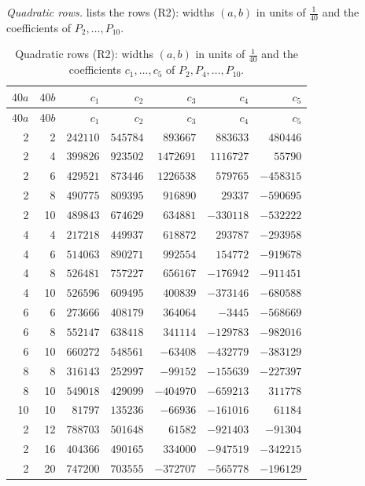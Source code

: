\documentclass[11pt,colorlinks]{charlie}
\begin{document}
\emph{Quadratic rows.}  lists the rows (R2): widths $(a,b)$ in units of $\frac1{40}$ and the coefficients of $P_2,\dots,P_{10}$.

{\small
\begin{longtable}{@{}rr rrrrr@{}}
\caption{Quadratic rows (R2): widths $(a,b)$ in units of $\frac1{40}$ and the coefficients $c_1,\dots,c_5$ of $P_2,P_4,\dots,P_{10}$.}\label{tab:quadratic}\\
\toprule $40a$ & $40b$ & $c_1$ & $c_2$ & $c_3$ & $c_4$ & $c_5$\\\midrule\endfirsthead
\toprule $40a$ & $40b$ & $c_1$ & $c_2$ & $c_3$ & $c_4$ & $c_5$\\\midrule\endhead
2 & 2 & $242110$ & $545784$ & $893667$ & $883633$ & $480446$\\
2 & 4 & $399826$ & $923502$ & $1472691$ & $1116727$ & $55790$\\
2 & 6 & $429521$ & $873446$ & $1226538$ & $579765$ & $-458315$\\
2 & 8 & $490775$ & $809395$ & $916890$ & $29337$ & $-590695$\\
2 & 10 & $489843$ & $674629$ & $634881$ & $-330118$ & $-532222$\\
4 & 4 & $217218$ & $449937$ & $618872$ & $293787$ & $-293958$\\
4 & 6 & $514063$ & $890271$ & $992554$ & $154772$ & $-919678$\\
4 & 8 & $526481$ & $757227$ & $656167$ & $-176942$ & $-911451$\\
4 & 10 & $526596$ & $609495$ & $400839$ & $-373146$ & $-680588$\\
6 & 6 & $273666$ & $408179$ & $364064$ & $-3445$ & $-568669$\\
6 & 8 & $552147$ & $638418$ & $341114$ & $-129783$ & $-982016$\\
6 & 10 & $660272$ & $548561$ & $-63408$ & $-432779$ & $-383129$\\
8 & 8 & $316143$ & $252997$ & $-99152$ & $-155639$ & $-227397$\\
8 & 10 & $549018$ & $429099$ & $-404970$ & $-659213$ & $311778$\\
10 & 10 & $81797$ & $135236$ & $-66936$ & $-161016$ & $61184$\\
2 & 12 & $788703$ & $501648$ & $61582$ & $-921403$ & $-91304$\\
2 & 16 & $404366$ & $490165$ & $334000$ & $-947519$ & $-342215$\\
2 & 20 & $747200$ & $703555$ & $-372707$ & $-565778$ & $-196129$\\

\end{longtable}}
\end{document}
